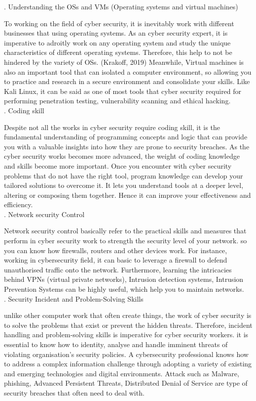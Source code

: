 \documentclass[a4paper, 11pt]{report}
\begin{document}
. Understanding the OSs and VMs (Operating systems and virtual machines)

\noindent To working on the field of cyber security, it is inevitably work with different businesses that using operating systems. As an cyber security expert, it is imperative to adroitly work on any operating system and study the unique characteristics of different operating systems. Therefore, this help to not be hindered by the variety of OSs.  (Krakoff,  2019) Meanwhile, Virtual machines is also an important tool that can isolated a computer environment, so allowing you to practice and research in a secure environment and consolidate your skills. Like Kali Linux, it can be said as one of most tools that cyber security required for performing penetration testing, vulnerability scanning and ethical hacking.\\

. Coding skill

\noindent Despite not all the works in cyber security require coding skill, it is the fundamental understanding of programming concepts and logic that can provide you with a valuable insights into how they are prone to security breaches. As the cyber security works becomes more advanced, the weight of coding knowledge and skills become more important. Once you encounter with cyber security problems that do not have the right tool, program knowledge can develop your tailored solutions to overcome it. It lets you understand tools at a deeper level, altering or composing them together. Hence it can improve your effectiveness and efficiency. \\

. Network security Control

Network security control basically refer to the practical skills and measures that perform in cyber security work to strength the security level of your network. so you can know how firewalls, routers and other devices work. For instance, working in cybersecurity field, it can basic to leverage a firewall to defend unauthorised traffic onto the network. Furthermore, learning the intricacies behind VPNs (virtual private networks), Intrusion detection systems, Intrusion Prevention Systems can be highly useful, which help you to maintain networks.\\

. Security Incident and Problem-Solving Skills 

\noindent unlike other computer work that often create things, the work of cyber security is to solve the problems that exist or prevent the hidden threats. Therefore, incident handling and problem-solving skills is imperative for cyber security workers. it is essential to know how to identity, analyse and handle imminent threats of violating organisation’s security policies. A cybersecurity professional knows how to address a complex information challenge through adopting a variety of existing and emerging technologies and digital environments. Attack such as Malware, phishing, Advanced Persistent Threats, Distributed Denial of Service are type of security breaches that often need to deal with.\\
\end{document}
